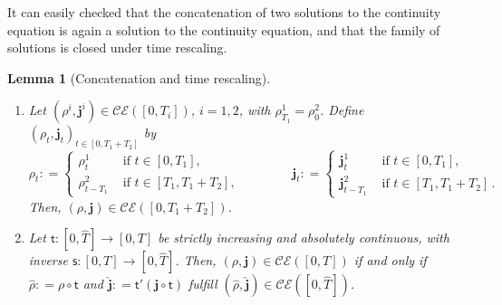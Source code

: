 \documentclass[11pt,reqno]{amsart}
\numberwithin{equation}{section}
\newcommand{\CE}[2]{\calC \calE([#1,#2])}
\newcommand{\calC}{\mathcal{C}}
\newcommand{\calE}{\mathcal{E}}
\newcommand{\Lip}{\mathrm{Lip}}
\newcommand{\dnabla}{\overline\nabla}
\newcommand{\dd}{\mathrm{d}}
\newtheorem{lemma}[theorem]{Lemma}
\theoremstyle{definition}
\newtheorem{remark}[theorem]{Remark}
\def\dd{\mathrm{d}}
\newcommand{\Bb}{\mathrm{B}_{\mathrm b}}
\newcommand{\bj}{{\boldsymbol j}}
\newcommand{\jj}{{\boldsymbol{j}}}
\newcommand{\Ed}{{E'}}
\newcommand{\dV}{\mathsf{d}}
\newcommand{\TODOBS}[1]{\todo[inline, color=red!40]{#1}}
\newcommand{\TODO}[1]{\todo[inline, color=cyan!20]{#1}}
\numberwithin{equation}{section}
\begin{document}


It can easily checked that the concatenation of two solutions to the continuity equation is again a solution to the continuity equation,
and that the family of solutions is closed 
under time rescaling.
\begin{lemma}[Concatenation and time rescaling]
\label{l:concatenation&rescaling}
\begin{enumerate}
\item Let $(\rho^i,\bj^i) \in \CE 0{T_i}$, $i=1,2$, with $\rho_{T_1}^1 = \rho_0^2$. Define $(\rho_t,\bj_t)_{t\in [0,T_{1}+T_2]}$ by 
\[
\rho_t: = \begin{cases}
\rho_t^1 & \text{ if } t \in [0,T_1],
\\
\rho_{t-T_1}^2 & \text{ if } t \in [T_1,T_1+T_2],
\end{cases}
\qquad \qquad 
\bj_t: = \begin{cases}
\bj_t^1 & \text{ if } t \in [0,T_1],
\\
\bj_{t-T_1}^2 & \text{ if } t \in [T_1,T_1+T_2]\,.
\end{cases}
\]
Then, $(\rho,\bj ) \in \CE 0{T_1+T_2}$.
\item
Let $\mathsf{t} : [0,\hat{T}] \to [0,T]$ be strictly increasing and absolutely continuous, with inverse $\mathsf{s}: [0,T]\to [0,\hat{T}]$. Then, $(\rho, \bj ) \in \CE 0T$ if and only if 
$\hat \rho: = \rho \circ \mathsf{t}$ and $\hat \bj : = \mathsf{t}' (\bj  {\circ} \mathsf{t})$  fulfill $(\hat \rho, \hat \bj ) \in \CE 0{\hat T}$. 
\end{enumerate}
\end{lemma}
\end{document}
